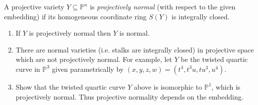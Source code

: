 \documentclass{book}
\begin{document}
\begin{exercise}
\label{exercise-projectively-normal-vars}
A projective variety $Y \subseteq
\mathbb{P}^n$ is {\it projectively normal} 
(with respect to the given embedding)
if its homogeneous coordinate ring
$S(Y)$ is integrally closed.
\begin{enumerate}
\item If $Y$ is projectively normal
then $Y$ is normal.
\item There are normal varieties 
(i.e. stalks are integrally closed)
in projective space which are not 
projectively normal.
For example, let $Y$ be the twisted
quartic curve in $\mathbb{P}^3$
given parametrically by
$(x,y,z,w)=(t^4,t^3u,tu^3,u^4)$.
\item Show that the twisted quartic curve
$Y$ above is isomorphic to $\mathbb{P}^1$,
which is projectively normal. Thus projective
normality depends on the embedding.
\end{enumerate}
\end{exercise}
\end{document}
